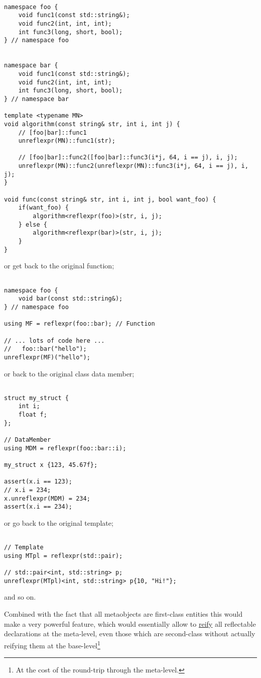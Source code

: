 \begin{verbatim}

namespace foo {
	void func1(const std::string&);
	void func2(int, int, int);
	int func3(long, short, bool);
} // namespace foo


namespace bar {
	void func1(const std::string&);
	void func2(int, int, int);
	int func3(long, short, bool);
} // namespace bar

template <typename MN>
void algorithm(const string& str, int i, int j) {
	// [foo|bar]::func1
	unreflexpr(MN)::func1(str);

	// [foo|bar]::func2([foo|bar]::func3(i*j, 64, i == j), i, j);
	unreflexpr(MN)::func2(unreflexpr(MN)::func3(i*j, 64, i == j), i, j);
}

void func(const string& str, int i, int j, bool want_foo) {
	if(want_foo) {
		algorithm<reflexpr(foo)>(str, i, j);
	} else {
		algorithm<reflexpr(bar)>(str, i, j);
	}
}

\end{verbatim}

or get back to the original function;

\begin{verbatim}

namespace foo {
	void bar(const std::string&);
} // namespace foo

using MF = reflexpr(foo::bar); // Function

// ... lots of code here ...
//   foo::bar("hello");
unreflexpr(MF)("hello");

\end{verbatim}

or back to the original class data member;

\begin{verbatim}

struct my_struct {
	int i;
	float f;
};

// DataMember
using MDM = reflexpr(foo::bar::i);

my_struct x {123, 45.67f};

assert(x.i == 123);
// x.i = 234;
x.unreflexpr(MDM) = 234;
assert(x.i == 234);

\end{verbatim}

or go back to the original template;

\begin{verbatim}

// Template
using MTpl = reflexpr(std::pair);

// std::pair<int, std::string> p;
unreflexpr(MTpl)<int, std::string> p{10, "Hi!"};

\end{verbatim}

and so on.

Combined with the fact that all metaobjects are first-class
entities this would make a very powerful feature, which would essentially
allow to \hyperref[term-reification]{reify} all reflectable declarations at
the meta-level, even those which are
second-class without actually reifying them at the base-level\footnote
{At the cost of the round-trip through the meta-level.}

